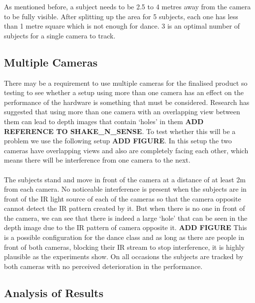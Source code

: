 \documentclass[10pt]{article}
\begin{document}
As mentioned before, a subject needs to be 2.5 to 4 metres away from the camera to be fully visible. After splitting up the area for 5 subjects, each one has less than 1 metre square which is not enough for dance. 3 is an optimal number of subjects for a single camera to track.\\


\subsection{Multiple Cameras}
\noindent
There may be a requirement to use multiple cameras for the finalised product so testing to see whether a setup using more than one camera has an effect on the performance of the hardware is something that must be considered. Research has suggested that using more than one camera with an overlapping view between them can lead to depth images that contain `holes' in them
\textbf{ADD REFERENCE TO SHAKE\_N\_SENSE}. To test whether this will be a problem we use the following setup 
\textbf{ADD FIGURE}. In this setup the two cameras have overlapping views and also are completely facing each other, which means there will be interference from one camera to the next. 
\\\\
\noindent
The subjects stand and move in front of the camera at a distance of at least 2m from each camera. No noticeable interference is present when the subjects are in front of the IR light source of each of the cameras so that the camera opposite cannot detect the IR pattern created by it. But when there is no one in front of the camera, we can see that there is indeed a large `hole' that can be seen in the depth image due to the IR pattern of camera opposite it. 
\textbf{ADD FIGURE}
This is a possible configuration for the dance class and as long as there are people in front of both cameras, blocking their IR stream to stop interference, it is highly plausible as the experiments show. On all occasions the subjects are tracked by both cameras with no perceived deterioration in the performance. 

\subsection{Analysis of Results}
\clearpage
\end{document}
